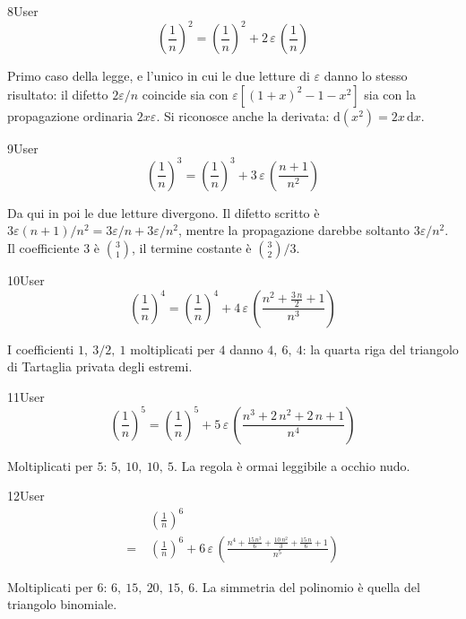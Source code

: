 \begin{espr}{8}{User}{}
\[
\left(\frac{1}{n}\right)^{2} = \left(\frac{1}{n}\right)^{2} + 2\, \varepsilon\, \left(\frac{1}{n}\right)
\]
\end{espr}
Primo caso della legge, e l'unico in cui le due letture di $\varepsilon$ danno lo stesso risultato: il difetto $2\varepsilon/n$ coincide sia con $\varepsilon\left[(1+x)^2-1-x^2\right]$ sia con la propagazione ordinaria $2x\varepsilon$. Si riconosce anche la derivata: $\mathrm{d}(x^2)=2x\,\mathrm{d}x$.

\begin{espr}{9}{User}{}
\[
\left(\frac{1}{n}\right)^{3} = \left(\frac{1}{n}\right)^{3} + 3\, \varepsilon\, \left(\frac{n + 1}{n^{2}}\right)
\]
\end{espr}
Da qui in poi le due letture divergono. Il difetto scritto è $3\varepsilon(n+1)/n^2=3\varepsilon/n+3\varepsilon/n^2$, mentre la propagazione darebbe soltanto $3\varepsilon/n^2$. Il coefficiente $3$ è $\binom{3}{1}$, il termine costante è $\binom{3}{2}/3$.

\begin{espr}{10}{User}{}
\[
\left(\frac{1}{n}\right)^{4} = \left(\frac{1}{n}\right)^{4} + 4\, \varepsilon\, \left(\frac{n^{2} + \frac{3\, n}{2} + 1}{n^{3}}\right)
\]
\end{espr}
I coefficienti $1,\ 3/2,\ 1$ moltiplicati per $4$ danno $4,\ 6,\ 4$: la quarta riga del triangolo di Tartaglia privata degli estremi.

\begin{espr}{11}{User}{}
\[
\left(\frac{1}{n}\right)^{5} = \left(\frac{1}{n}\right)^{5} + 5\, \varepsilon\, \left(\frac{n^{3} + 2\, n^{2} + 2\, n + 1}{n^{4}}\right)
\]
\end{espr}
Moltiplicati per $5$: $5,\ 10,\ 10,\ 5$. La regola è ormai leggibile a occhio nudo.

\begin{espr}{12}{User}{}
\begin{align*}
& \left(\frac{1}{n}\right)^{6} \\
=\;& \left(\frac{1}{n}\right)^{6} + 6\, \varepsilon\, \left(\frac{n^{4} + \frac{15\, n^{3}}{6} + \frac{10\, n^{2}}{3} + \frac{15\, n}{6} + 1}{n^{5}}\right)
\end{align*}
\end{espr}
Moltiplicati per $6$: $6,\ 15,\ 20,\ 15,\ 6$. La simmetria del polinomio è quella del triangolo binomiale.

